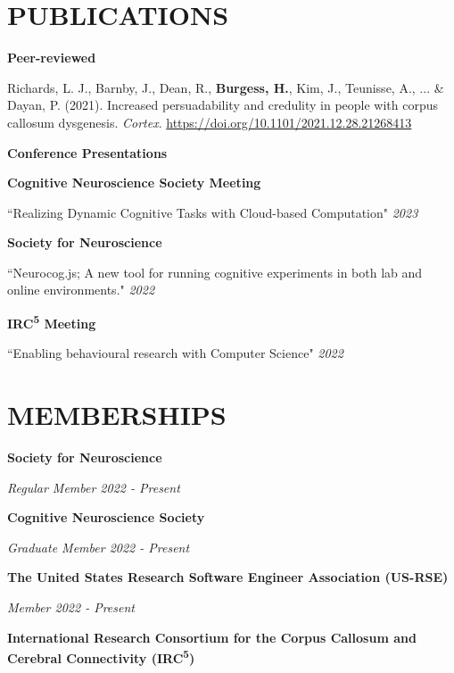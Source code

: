 \documentclass{article}
\begin{document}
  \section*{\centering\uppercase{Publications}}

  {\large\textbf{Peer-reviewed}}

  Richards, L. J., Barnby, J., Dean, R., \textbf{Burgess, H.}, Kim, J., Teunisse, A., ... \& Dayan, P. (2021). Increased persuadability and credulity in people with corpus callosum dysgenesis. \textit{Cortex}.
  \href{https://doi.org/10.1101/2021.12.28.21268413}{https://doi.org/10.1101/2021.12.28.21268413}

  \medbreak

  {\large\textbf{Conference Presentations}}

  \textbf{Cognitive Neuroscience Society Meeting}

  ``Realizing Dynamic Cognitive Tasks with Cloud-based Computation" \hfill \textit{2023}

  \medbreak

  \textbf{Society for Neuroscience}

  ``Neurocog.js; A new tool for running cognitive experiments in both lab and online environments." \hfill \textit{2022}

  \medbreak

  \textbf{IRC\textsuperscript{5} Meeting}

  ``Enabling behavioural research with Computer Science" \hfill \textit{2022}

  \section*{\centering\uppercase{Memberships}}

  {\textbf{Society for Neuroscience}}

  \textit{Regular Member \hfill 2022 - Present}

  \medbreak

  {\textbf{Cognitive Neuroscience Society}}

  \textit{Graduate Member \hfill 2022 - Present}

  \medbreak

  {\textbf{The United States Research Software Engineer Association (US-RSE)}}

  \textit{Member \hfill 2022 - Present}

  \medbreak

  {\textbf{International Research Consortium for the Corpus Callosum and Cerebral Connectivity (IRC\textsuperscript{5})}}
\end{document}
